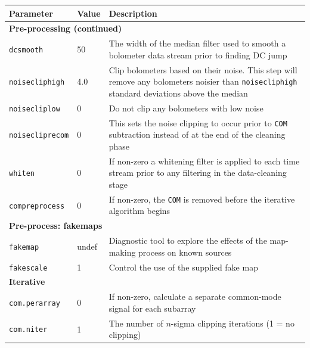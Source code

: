 \documentclass[twoside,11pt]{article}
\newenvironment{latexonly}{}{}
\renewcommand{\_}{\texttt{\symbol{95}}}
\newcommand{\param}[1]{\texttt{#1}}
\newcommand{\model}[1]{\texttt{#1}}
\begin{document}
\begin{latexonly}
\begin{table}
\begin{center}
\begin{small}
\begin{tabular}{|p{2.9cm}|p{1.1cm}|p{10.7cm}|}
\hline
Parameter & Value & Description \\
\hline
\multicolumn{3}{|l|}{\textbf{Pre-processing (continued)}}\\
\hline
\param{dcsmooth}      &   50 & The width of the median filter used to smooth a
                               bolometer data stream prior to finding DC jump \\
\param{noisecliphigh} &  4.0 & Clip bolometers based on their noise. This step
                               will remove any bolometers noisier than
                               \param{noisecliphigh}
                               standard deviations above the median \\
\param{noisecliplow}   &   0 & Do not clip any bolometers with low noise \\
\param{noisecliprecom} &   0 & This sets the noise clipping to occur prior to
                               \model{COM} subtraction instead of at the end of
                               the cleaning phase \\
\param{whiten}         &   0 & If non-zero a whitening filter is applied to each
                               time stream prior to any filtering in the
                               data-cleaning stage \\
\param{compreprocess}  &   0 & If non-zero, the \model{COM} is removed before the
                               iterative algorithm begins \\
\hline
\multicolumn{3}{|l|}{\textbf{Pre-process: fakemaps}}\\
\hline
\param{fakemap}        & undef & Diagnostic tool to explore the effects of the
                                 map-making process on known sources \\
\param{fakescale}      &     1 & Control the use of the supplied fake map \\
\hline
\multicolumn{3}{|l|}{\textbf{Iterative}}\\
\hline
\param{com.perarray}     &      0 & If non-zero, calculate a separate common-mode
                                    signal for each subarray \\
\param{com.niter}        &      1 & The number of $n$-sigma clipping iterations
                                    (1 = no clipping) \\

\end{tabular}
\end{small}
\end{center}
\end{table}
\end{latexonly}
\end{document}

